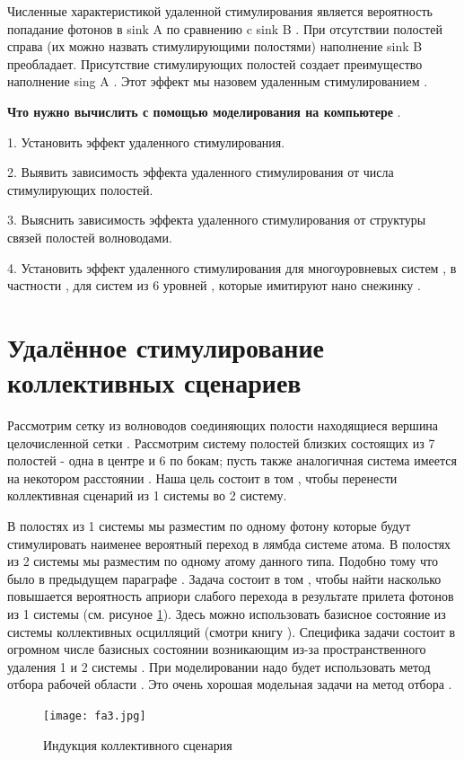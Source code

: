 \documentclass[12pt]{article}
\begin{document}
Численные характеристикой удаленной стимулирования является вероятность попадание фотонов в sink A по сравнению c sink B . При отсутствии полостей справа (их можно назвать стимулирующими полостями) наполнение sink B преобладает. Присутствие стимулирующих полостей создает преимущество наполнение sing A . Этот эффект мы назовем удаленным стимулированием . 

{\bf Что нужно вычислить с помощью моделирования на компьютере }. 

1. Установить эффект удаленного стимулирования. 

2. Выявить зависимость эффекта удаленного стимулирования от числа стимулирующих полостей. 

3. Выяснить зависимость эффекта удаленного стимулирования от структуры связей полостей волноводами.  

4. Установить эффект удаленного стимулирования для многоуровневых систем , в частности , для систем из 6 уровней , которые имитируют нано снежинку . 

\section{Удалённое стимулирование коллективных сценариев }

Рассмотрим сетку из волноводов соединяющих полости находящиеся вершина целочисленной сетки . Рассмотрим систему полостей близких состоящих из 7 полостей - одна в центре и 6 по бокам; пусть также аналогичная система имеется на некотором расстоянии . Наша цель состоит в том , чтобы перенести коллективная сценарий из 1 системы во 2 систему. 

В полостях из 1 системы мы разместим по одному фотону которые будут стимулировать наименее вероятный переход в лямбда системе атома. В полостях из 2 системы мы разместим по одному атому данного типа. Подобно тому что было в предыдущем параграфе . Задача состоит в том , чтобы найти насколько повышается вероятность априори слабого перехода в результате прилета фотонов из 1 системы (см. рисуное \ref{fig:fa3}). Здесь можно использовать базисное состояние из системы коллективных осцилляций (смотри книгу ). Специфика задачи состоит в огромном числе базисных состоянии возникающим из-за пространственного удаления 1 и 2 системы . При моделировании надо будет использовать метод отбора рабочей области . Это очень хорошая модельная задачи на метод отбора . 

\begin{figure}[H]
\centering
\texttt{[image: fa3.jpg]} 
\caption{ Индукция коллективного сценария}
\label{fig:fa3}
\end{figure}
\end{document}
